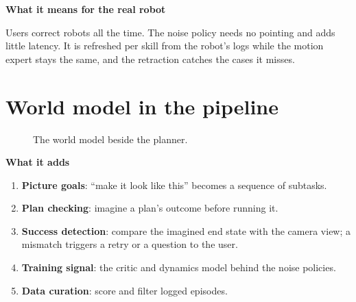 \documentclass[11pt,a4paper]{article}
\newcommand{\sub}[1]{\par\needspace{4\baselineskip}\smallskip\noindent\textbf{#1}\par}
\begin{document}
\sub{What it means for the real robot}
Users correct robots all the time. The noise policy needs no pointing and adds little latency. It is refreshed per skill from the robot's logs while the motion expert stays the same, and the retraction catches the cases it misses.

\section{World model in the pipeline}
\label{sec:prop-wm}
\begin{figure}[!htbp]\centering
{}
\caption{The world model beside the planner.}
\end{figure}

\sub{What it adds}
\begin{enumerate}
\item \textbf{Picture goals}: ``make it look like this'' becomes a sequence of subtasks.
\item \textbf{Plan checking}: imagine a plan's outcome before running it.
\item \textbf{Success detection}: compare the imagined end state with the camera view; a mismatch triggers a retry or a question to the user.
\item \textbf{Training signal}: the critic and dynamics model behind the noise policies.
\item \textbf{Data curation}: score and filter logged episodes.
\end{enumerate}
\end{document}
